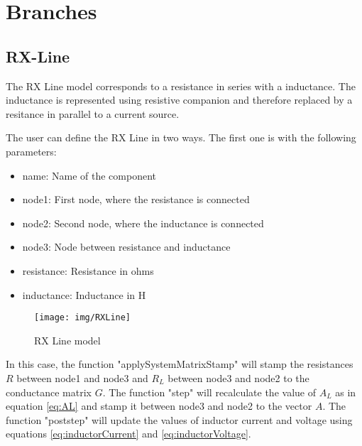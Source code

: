 \section{Branches}

\subsection{RX-Line}
The RX Line model corresponds to a resistance in series with a inductance. The inductance is represented using resistive companion and therefore replaced by a resitance in parallel to a current source.

The user can define the RX Line in two ways. The first one is with the following parameters:

\begin{itemize}
\item name: Name of the component
\item node1: First node, where the resistance is connected
\item node2: Second node, where the inductance is connected
\item node3: Node between resistance and inductance 
\item resistance: Resistance in ohms
\item inductance: Inductance in H
\end{itemize}

\begin{figure}[h]
	\centering
	\texttt{[image: img/RXLine]} 
	\caption{RX Line model}
	\label{fig:RxLine}
\end{figure}

In this case, the function "applySystemMatrixStamp" will stamp the resistances $R$ between node1 and node3 and $R_L$ between node3 and node2 to the conductance matrix $G$. The function "step" will recalculate the value of $A_L$ as in equation \ref{eq:AL} and stamp it between node3 and node2 to the vector $A$. The function "poststep" will update the values of inductor current and voltage using equations \ref{eq:inductorCurrent} and \ref{eq:inductorVoltage}.

